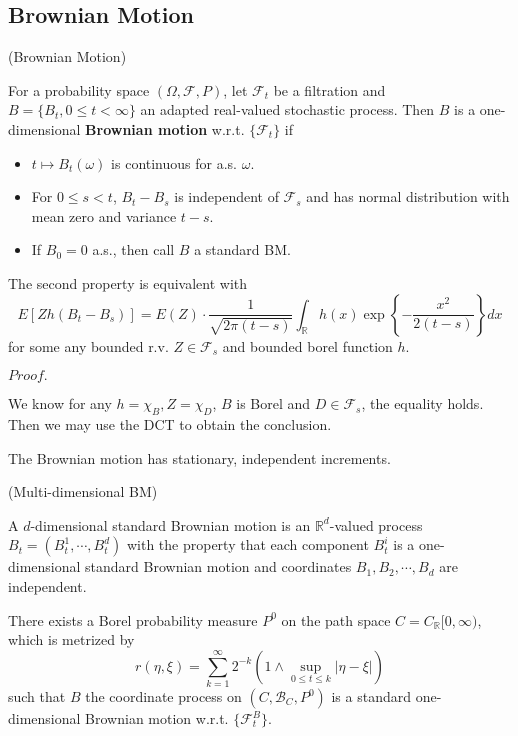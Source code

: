 \documentclass{article}
\newcommand{\Pf}[1]{$Proof.$\par}
\newcommand{\F}{\mathcal{F}}
\begin{document}
\subsection{Brownian Motion}

\begin{definition}(Brownian Motion)\par
    For a probability space $(\Omega,\F,P)$, let $\F_t$ be a filtration and $B = \{B_t, 0\leq t < \infty\}$ an adapted real-valued stochastic process. Then $B$ is a one-dimensional \textbf{Brownian motion} w.r.t. $\{\F_t\}$ if
    \begin{itemize}
        \item $t\mapsto B_t(\omega)$ is continuous for a.s. $\omega$.
        \item For $0\leq s < t$, $B_t - B_s$ is independent of $\F_s$ and has normal distribution with mean zero and variance $t-s$.
        \item If $B_0 = 0$ a.s., then call $B$ a standard BM.
    \end{itemize}
\end{definition}

\begin{proposition}
    The second property is equivalent with
    \[
    E[Zh(B_t-B_s)] = E(Z)\cdot \dfrac{1}{\sqrt{2\pi(t-s)}}\int_{\mathbb{R}} h(x) \exp\left\{-\dfrac{x^2}{2(t-s)}\right\}dx
    \]
    for some any bounded r.v. $Z \in \F_s$ and bounded borel function $h$.
\end{proposition}
\Pf\par
We know for any $h = \chi_B, Z = \chi_D$, $B$ is Borel and $D \in \F_s$, the equality holds. Then we may use the DCT to obtain the conclusion.

\begin{proposition}
    The Brownian motion has stationary, independent increments.
\end{proposition}

\begin{definition}(Multi-dimensional BM)\par
    A $d$-dimensional standard Brownian motion is an $\mathbb{R}^d$-valued process $B_t = (B_t^1,\cdots,B_t^d)$ with the property that each component $B_t^i$ is a one-dimensional standard Brownian motion and coordinates $B_1,B_2,\cdots,B_d$ are independent.
\end{definition}

\begin{theorem}
    There exists a Borel probability measure $P^0$ on the path space $C = C_{\mathbb{R}}[0,\infty)$, which is metrized by
    \[r(\eta,\xi) = \sum\limits_{k=1}^{\infty}2^{-k}(1\wedge \sup_{0\leq t \leq k} |\eta - \xi|)\]
    such that $B$ the coordinate process on $(C,\mathcal{B}_C, P^0)$ is a standard one-dimensional Brownian motion w.r.t. $\{\F_t^B\}$.
\end{theorem}
\end{document}
